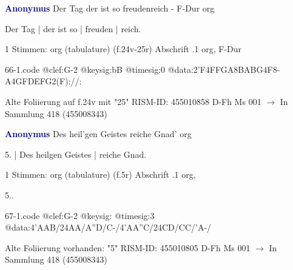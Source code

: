 \documentclass[twocolumn]{book}
\begin{document}
\newline \par \vspace{7pt} \textcolor{darkblue}{\textbf{Anonymus  }}
\newline Der Tag der ist so freudenreich - F-Dur
\newline org
\newline \begin{itshape}[f.25r, at left:] Der Tag | der ist so | freuden | reich.\end{itshape} 
\newline \textcolor{darkblue}{}  1 Stimmen: org (tabulature)  (f.24v-25r)
\newline Abschrift
.1  org, F-Dur  
\begin{filecontents*}{66-1.code}
@clef:G-2
@keysig:bB
@timesig:0
@data:2'F4FFGA{8BABG}4F8-A4GFDEFG2(F)://:
\end{filecontents*}
\newline
%
\newline Alte Foliierung auf f.24v mit "25"
\newline RISM-ID: 455010858
\newline D-Fh  Ms 001
\newline $\rightarrow$ In Sammlung 418 (455008343)
      
\newline \par \vspace{7pt} \textcolor{darkblue}{\textbf{Anonymus  }}
\newline Des heil'gen Geistes reiche Gnad'
\newline org
\newline \begin{itshape}[f.5r, at left:] 5. | Des heilgen Geistes | reiche Gnad.\end{itshape} 
\newline \textcolor{darkblue}{}  1 Stimmen: org (tabulature)  (f.5r)
\newline Abschrift
.1  org, \begin{itshape}5..\end{itshape}  
\begin{filecontents*}{67-1.code}
@clef:G-2
@keysig:
@timesig:3
@data:4'AAB/24AA/A''D/C-/4'AA''C/24CD/CC/'A-/
\end{filecontents*}
\newline
%
\newline Alte Foliierung vorhanden: "5"
\newline RISM-ID: 455010805
\newline D-Fh  Ms 001
\newline $\rightarrow$ In Sammlung 418 (455008343)
      
\end{document}
